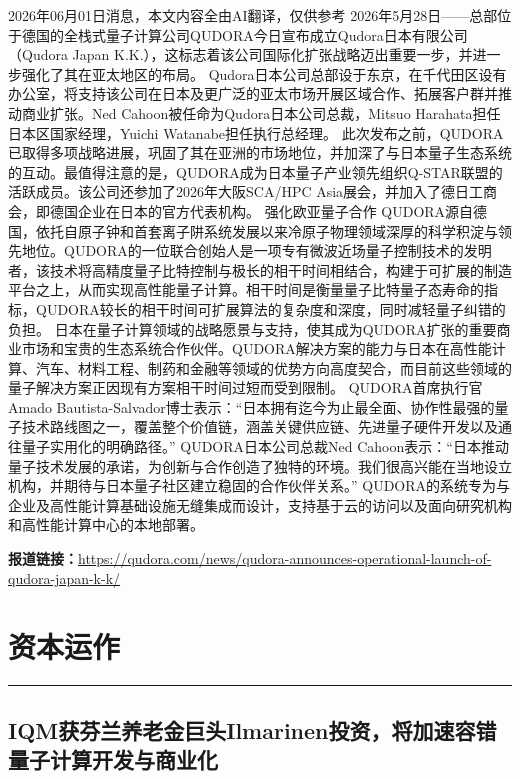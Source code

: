 \documentclass[12pt,a4paper]{ctexart}
\begin{document}
2026年06月01日消息，本文内容全由AI翻译，仅供参考
2026年5月28日——总部位于德国的全栈式量子计算公司QUDORA今日宣布成立Qudora日本有限公司（Qudora Japan K.K.），这标志着该公司国际化扩张战略迈出重要一步，并进一步强化了其在亚太地区的布局。
Qudora日本公司总部设于东京，在千代田区设有办公室，将支持该公司在日本及更广泛的亚太市场开展区域合作、拓展客户群并推动商业扩张。Ned Cahoon被任命为Qudora日本公司总裁，Mitsuo Harahata担任日本区国家经理，Yuichi Watanabe担任执行总经理。
此次发布之前，QUDORA已取得多项战略进展，巩固了其在亚洲的市场地位，并加深了与日本量子生态系统的互动。最值得注意的是，QUDORA成为日本量子产业领先组织Q-STAR联盟的活跃成员。该公司还参加了2026年大阪SCA/HPC Asia展会，并加入了德日工商会，即德国企业在日本的官方代表机构。
强化欧亚量子合作
QUDORA源自德国，依托自原子钟和首套离子阱系统发展以来冷原子物理领域深厚的科学积淀与领先地位。QUDORA的一位联合创始人是一项专有微波近场量子控制技术的发明者，该技术将高精度量子比特控制与极长的相干时间相结合，构建于可扩展的制造平台之上，从而实现高性能量子计算。相干时间是衡量量子比特量子态寿命的指标，QUDORA较长的相干时间可扩展算法的复杂度和深度，同时减轻量子纠错的负担。
日本在量子计算领域的战略愿景与支持，使其成为QUDORA扩张的重要商业市场和宝贵的生态系统合作伙伴。QUDORA解决方案的能力与日本在高性能计算、汽车、材料工程、制药和金融等领域的优势方向高度契合，而目前这些领域的量子解决方案正因现有方案相干时间过短而受到限制。
QUDORA首席执行官Amado Bautista-Salvador博士表示：“日本拥有迄今为止最全面、协作性最强的量子技术路线图之一，覆盖整个价值链，涵盖关键供应链、先进量子硬件开发以及通往量子实用化的明确路径。”
QUDORA日本公司总裁Ned Cahoon表示：“日本推动量子技术发展的承诺，为创新与合作创造了独特的环境。我们很高兴能在当地设立机构，并期待与日本量子社区建立稳固的合作伙伴关系。”
QUDORA的系统专为与企业及高性能计算基础设施无缝集成而设计，支持基于云的访问以及面向研究机构和高性能计算中心的本地部署。

\noindent\textbf{报道链接：}\url{https://qudora.com/news/qudora-announces-operational-launch-of-qudora-japan-k-k/}


\newpage
\section{资本运作}
\vspace{-0.5em}
\noindent\rule{\linewidth}{1.5pt}

\subsection{ IQM获芬兰养老金巨头Ilmarinen投资，将加速容错量子计算开发与商业化 }
\end{document}
